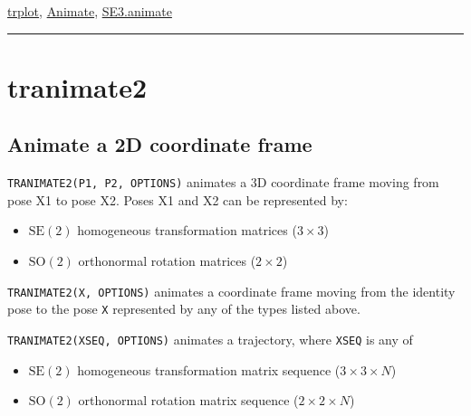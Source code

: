 \hyperlink{trplot}{\color{blue} trplot}, \hyperlink{Animate}{\color{blue} Animate}, \hyperlink{SE3.animate}{\color{blue} SE3.animate}

\vspace{1.5ex}\rule{\textwidth}{1mm}

\hypertarget{tranimate2}{\section*{tranimate2}}
\subsection*{Animate a 2D coordinate frame}


\texttt{TRANIMATE2(P1, P2, OPTIONS)} animates a 3D coordinate frame moving from pose X1
to pose X2.  Poses X1 and X2 can be represented by:

\begin{itemize}
  \item $\mbox{SE}(2)$ homogeneous transformation matrices ($3 \times 3$)
  \item $\mbox{SO}(2)$ orthonormal rotation matrices ($2 \times 2$)
\end{itemize}


\texttt{TRANIMATE2(X, OPTIONS)} animates a coordinate frame moving from the identity pose
to the pose \texttt{X} represented by any of the types listed above.



\texttt{TRANIMATE2(XSEQ, OPTIONS)} animates a trajectory, where \texttt{XSEQ} is any of

\begin{itemize}
  \item $\mbox{SE}(2)$ homogeneous transformation matrix sequence ($3 \times 3 \times N$)
  \item $\mbox{SO}(2)$ orthonormal rotation matrix sequence ($2 \times 2 \times N$)
\end{itemize}

